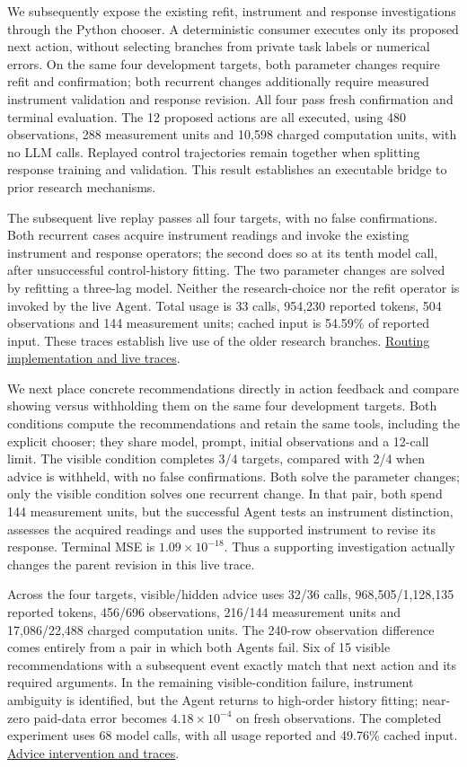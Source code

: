 \documentclass[twoside,11pt]{article}
\begin{document}
We subsequently expose the existing refit, instrument and response investigations
through the Python chooser. A deterministic consumer executes only its proposed
next action, without selecting branches from private task labels or numerical
errors. On the same four development targets, both parameter changes require
refit and confirmation; both recurrent changes additionally require measured
instrument validation and response revision. All four pass fresh confirmation
and terminal evaluation. The 12 proposed actions are all executed, using 480
observations, 288 measurement units and 10,598 charged computation units, with
no LLM calls. Replayed control trajectories remain together when splitting
response training and validation. This result establishes an executable bridge
to prior research mechanisms.


The subsequent live replay passes all four targets, with no false confirmations.
Both recurrent cases acquire instrument readings and invoke the existing
instrument and response operators; the second does so at its tenth model call,
after unsuccessful control-history fitting. The two parameter changes are solved
by refitting a three-lag model. Neither the research-choice nor the refit operator
is invoked by the live Agent. Total usage is 33 calls, 954,230 reported tokens,
504 observations and 144 measurement units; cached input is 54.59\% of reported
input. These traces establish live use of the older research branches.
\hyperlink{artifact-82}{Routing implementation and live traces}.


We next place concrete recommendations directly in action feedback and compare
showing versus withholding them on the same four development targets. Both
conditions compute the recommendations and retain the same tools, including the
explicit chooser; they share model, prompt, initial observations and a 12-call
limit. The visible condition completes 3/4 targets, compared with 2/4 when advice
is withheld, with no false confirmations. Both solve the parameter changes;
only the visible condition solves one recurrent change. In that pair, both
spend 144 measurement units, but the successful Agent tests an instrument
distinction, assesses the acquired readings and uses the supported instrument
to revise its response. Terminal MSE is \(1.09\times10^{-18}\). Thus a supporting
investigation actually changes the parent revision in this live trace.


Across the four targets, visible/hidden advice uses 32/36 calls,
968,505/1,128,135 reported tokens, 456/696 observations, 216/144 measurement units
and 17,086/22,488 charged computation units. The 240-row observation difference
comes entirely from a pair in which both Agents fail. Six of 15 visible
recommendations with a subsequent event exactly match that next action and its
required arguments. In the remaining visible-condition failure, instrument
ambiguity is identified, but the Agent returns to high-order history fitting;
near-zero paid-data error becomes \(4.18\times10^{-4}\) on fresh observations.
The completed experiment uses 68 model calls, with all usage reported and 49.76\%
cached input. \hyperlink{artifact-83}{Advice intervention and traces}.
\end{document}
